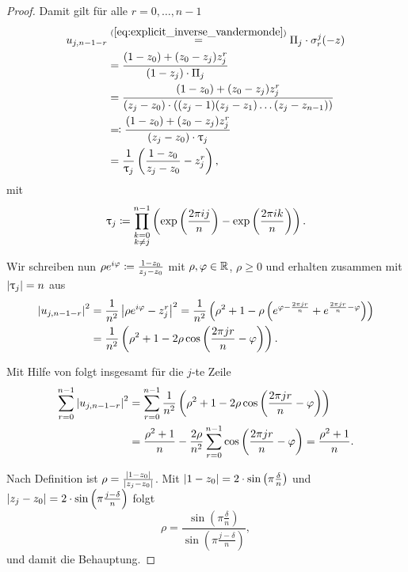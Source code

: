 \begin{proof}
    \noindent Damit gilt für alle $r=0, \dots, n-1$
    \[
        \begin{split}
            u_{j,n-1-r}
            &\overset{(\ref{eq:explicit_inverse_vandermonde})}=
                \Pi_j \cdot \sigma_{r}^j(-z) \\
            &= \frac{(1 - z_0) + (z_0 - z_j) z_j^r}{(1-z_j) \cdot \Pi_j}\\
            &= \frac{(1 - z_0) + (z_0 - z_j) z_j^r}{(z_j-z_0) \cdot \left((z_j - 1) (z_j - z_1) \dots (z_j - z_{n-1}) \right)}\\
            &\eqqcolon \frac{(1 - z_0) + (z_0 - z_j) z_j^r}{(z_j-z_0) \cdot \uptau_j }\\
            &= \frac{1}{\uptau_j} \left( \frac{1 - z_0}{z_j-z_0} - z_j^r \right),
        \end{split}
    \]
    mit
    \[
        \uptau_j \coloneqq \prod_{\substack{k=0\\k\neq j}}^{n-1} \left( \exp\left(\frac{2 \pi i j}{n}\right) - \exp\left(\frac{2 \pi i k}{n}\right) \right).
    \]

    \noindent Wir schreiben nun $ \rho e^{i\varphi} \coloneqq \frac{1-z_0}{z_j-z_0} $
    mit $\rho, \varphi \in \mathbb{R}$, $\rho \geq 0$ und erhalten zusammen mit $\left\lvert \uptau_j \right\rvert = n$ aus 
    \[
        \begin{split}
            \left\lvert u_{j,n-1-r} \right\rvert^2
            &= \frac{1}{n^2} \left\lvert  \rho e^{i\varphi} - z_j^r  \right\rvert^2
            = \frac{1}{n^2} \left( \rho^2 + 1 - \rho \left( e^{\varphi - \frac{2\pi j r}{n}} + e^{\frac{2 \pi j r } {n} - \varphi} \right) \right)\\
            &= \frac{1}{n^2} \left( \rho^2 + 1 - 2 \rho \cos \left( \frac{2 \pi j r}{n} - \varphi \right) \right).
        \end{split}
    \]

    \noindent Mit Hilfe von  folgt insgesamt
    für die $j$-te Zeile
    \[
        \begin{split}
            \sum_{r=0}^{n-1} \left\lvert u_{j,n-1-r} \right\rvert^2
            &= \sum_{r=0}^{n-1} \frac{1}{n^2} \left( \rho^2 + 1 - 2 \rho \cos \left( \frac{2 \pi j r}{n} - \varphi \right) \right)\\
            &= \frac{\rho^2 + 1}{n} - \frac{2 \rho}{n^2} \sum_{r=0}^{n-1} \cos \left( \frac{2 \pi j r}{n} - \varphi \right)
            = \frac{\rho^2 + 1}{n}.
        \end{split}
    \]

    \noindent Nach Definition ist $\rho = \frac{\left\lvert  1 - z_0 \right\rvert}{\left\lvert z_j - z_0 \right\rvert}$.
    Mit
    $\left\lvert 1-z_0 \right\rvert = 2 \cdot \sin \left( \pi \frac{\delta}{n} \right)$
    und
    $\left\lvert z_j-z_0 \right\rvert = 2 \cdot \sin \left( \pi \frac{j - \delta}{n} \right)$
    folgt
    \[
        \rho = \frac{\sin \left( \pi \frac{\delta}{n} \right)}{\sin \left( \pi \frac{j - \delta}{n} \right)},
    \]
    und damit die Behauptung.
\end{proof}

